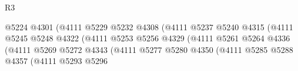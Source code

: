 \begin{lexlean}{R3}
\begin{coremodule}
                                                        @5224
                                                        @4301
                                                        (@4111
                                                          @5229
                                                          @5232
                                                          @4308
                                                          (@4111
                                                            @5237
                                                            @5240
                                                            @4315
                                                            (@4111
                                                              @5245
                                                              @5248
                                                              @4322
                                                              (@4111
                                                                @5253
                                                                @5256
                                                                @4329
                                                                (@4111
                                                                  @5261
                                                                  @5264
                                                                  @4336
                                                                  (@4111
                                                                    @5269
                                                                    @5272
                                                                    @4343
                                                                    (@4111
                                                                      @5277
                                                                      @5280
                                                                      @4350
                                                                      (@4111
                                                                        @5285
                                                                        @5288
                                                                        @4357
                                                                        (@4111
                                                                          @5293
                                                                          @5296

\end{coremodule}
\end{lexlean}
